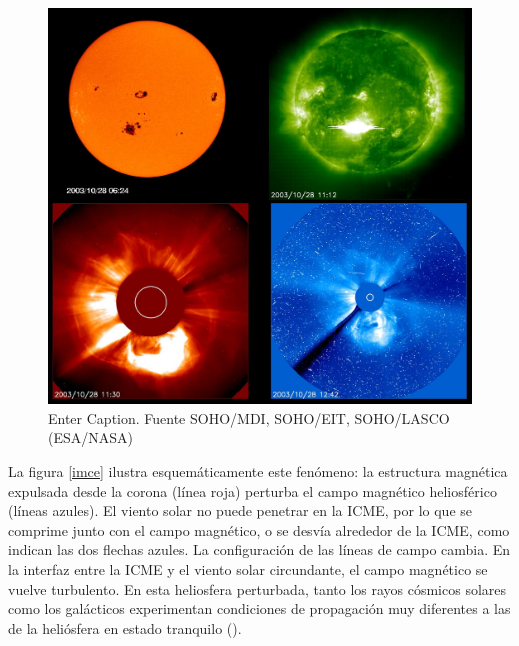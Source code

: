 \begin{figure}[H]
    \centering
    \includegraphics[width=0.6\linewidth]{Figs/flare_2003-10-28.jpg}
    \caption{Enter Caption. Fuente SOHO/MDI, SOHO/EIT, SOHO/LASCO (ESA/NASA)}
    \label{CME_2003}
\end{figure}

La figura \ref{imce} ilustra esquemáticamente este fenómeno: la estructura magnética expulsada desde la corona (línea roja) perturba el campo magnético heliosférico (líneas azules). El viento solar no puede penetrar en la ICME, por lo que se comprime junto con el campo magnético, o se desvía alrededor de la ICME, como indican las dos flechas azules. La configuración de las líneas de campo cambia. En la interfaz entre la ICME y el viento solar circundante, el campo magnético se vuelve turbulento. En esta heliosfera perturbada, tanto los rayos cósmicos solares como los galácticos experimentan condiciones de propagación muy diferentes a las de la heliósfera en estado tranquilo (\cite{NMDB}).

